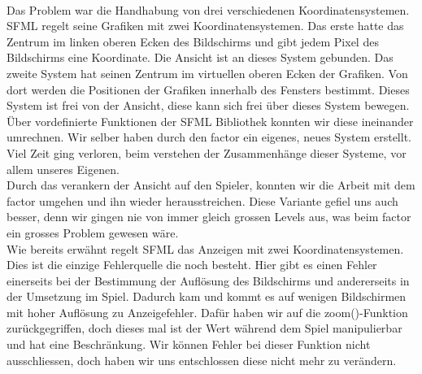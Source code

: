 \documentclass[11pt,a4paper]{scrbook}
\begin{document}
\\
Das Problem war die Handhabung von drei verschiedenen Koordinatensystemen.
SFML regelt seine Grafiken mit zwei Koordinatensystemen.
Das erste hatte das Zentrum im linken oberen Ecken des Bildschirms und gibt jedem Pixel des Bildschirms eine Koordinate. 
Die Ansicht ist an dieses System gebunden.
Das zweite System hat seinen Zentrum im virtuellen oberen Ecken der Grafiken. 
Von dort werden die Positionen der Grafiken innerhalb des Fensters bestimmt. 
Dieses System ist frei von der Ansicht, diese kann sich frei über dieses System bewegen.
Über vordefinierte Funktionen der SFML Bibliothek konnten wir diese ineinander umrechnen.
Wir selber haben durch den factor ein eigenes, neues System erstellt.
Viel Zeit ging verloren, beim verstehen der Zusammenhänge dieser Systeme, vor allem unseres Eigenen.
\\
Durch das verankern der Ansicht auf den Spieler, konnten wir die Arbeit mit dem factor umgehen und ihn wieder herausstreichen.
Diese Variante gefiel uns auch besser, denn wir gingen nie von immer gleich grossen Levels aus, was beim factor ein grosses Problem gewesen wäre.
\\
Wie bereits erwähnt regelt SFML das Anzeigen mit zwei Koordinatensystemen.
Dies ist die einzige Fehlerquelle die noch besteht.
Hier gibt es einen Fehler einerseits bei der Bestimmung der Auflösung des Bildschirms und andererseits in der Umsetzung im Spiel.
Dadurch kam und kommt es auf wenigen Bildschirmen mit hoher Auflösung zu Anzeigefehler.
Dafür haben wir auf die zoom()-Funktion zurückgegriffen, doch dieses mal ist der Wert während dem Spiel manipulierbar und hat eine Beschränkung.
Wir können Fehler bei dieser Funktion nicht ausschliessen, doch haben wir uns entschlossen diese nicht mehr zu verändern.
\end{document}
